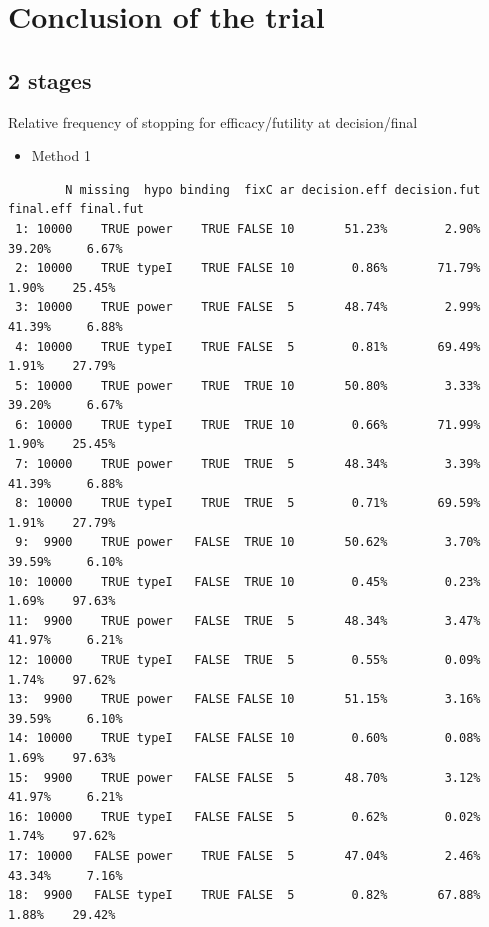 \documentclass[12pt]{article}
\begin{document}
\clearpage

\section{Conclusion of the trial}
\label{sec:org400e8f1}

\subsection{2 stages}
\label{sec:org05c723f}
Relative frequency of stopping for efficacy/futility at decision/final

\begin{itemize}
\item Method 1
\end{itemize}
\begin{verbatim}
        N missing  hypo binding  fixC ar decision.eff decision.fut final.eff final.fut
 1: 10000    TRUE power    TRUE FALSE 10       51.23%        2.90%    39.20%     6.67%
 2: 10000    TRUE typeI    TRUE FALSE 10        0.86%       71.79%     1.90%    25.45%
 3: 10000    TRUE power    TRUE FALSE  5       48.74%        2.99%    41.39%     6.88%
 4: 10000    TRUE typeI    TRUE FALSE  5        0.81%       69.49%     1.91%    27.79%
 5: 10000    TRUE power    TRUE  TRUE 10       50.80%        3.33%    39.20%     6.67%
 6: 10000    TRUE typeI    TRUE  TRUE 10        0.66%       71.99%     1.90%    25.45%
 7: 10000    TRUE power    TRUE  TRUE  5       48.34%        3.39%    41.39%     6.88%
 8: 10000    TRUE typeI    TRUE  TRUE  5        0.71%       69.59%     1.91%    27.79%
 9:  9900    TRUE power   FALSE  TRUE 10       50.62%        3.70%    39.59%     6.10%
10: 10000    TRUE typeI   FALSE  TRUE 10        0.45%        0.23%     1.69%    97.63%
11:  9900    TRUE power   FALSE  TRUE  5       48.34%        3.47%    41.97%     6.21%
12: 10000    TRUE typeI   FALSE  TRUE  5        0.55%        0.09%     1.74%    97.62%
13:  9900    TRUE power   FALSE FALSE 10       51.15%        3.16%    39.59%     6.10%
14: 10000    TRUE typeI   FALSE FALSE 10        0.60%        0.08%     1.69%    97.63%
15:  9900    TRUE power   FALSE FALSE  5       48.70%        3.12%    41.97%     6.21%
16: 10000    TRUE typeI   FALSE FALSE  5        0.62%        0.02%     1.74%    97.62%
17: 10000   FALSE power    TRUE FALSE  5       47.04%        2.46%    43.34%     7.16%
18:  9900   FALSE typeI    TRUE FALSE  5        0.82%       67.88%     1.88%    29.42%
\end{verbatim}

\clearpage
\end{document}
